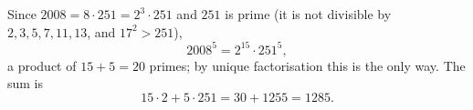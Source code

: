 Since $2008=8\cdot251=2^3\cdot251$ and $251$ is prime (it is not divisible by $2,3,5,7,11,13$, and $17^2>251$),
\[2008^5=2^{15}\cdot251^5,\]
a product of $15+5=20$ primes; by unique factorisation this is the only way. The sum is
\[15\cdot2+5\cdot251=30+1255=\boxed{1285}.\]
